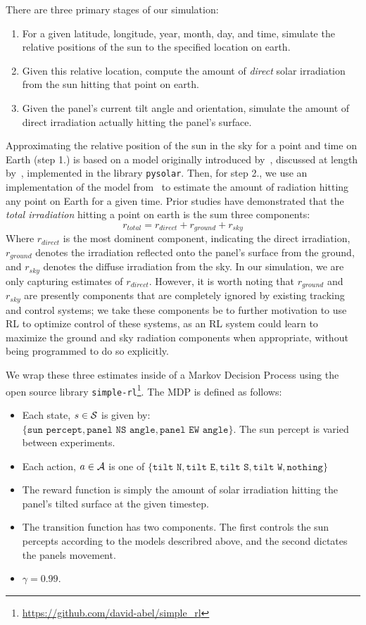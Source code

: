 \documentclass[11pt]{article}
\begin{document}
There are three primary stages of our simulation:
\begin{enumerate}
\item For a given latitude, longitude, year, month, day, and time, simulate the relative positions of the sun to the specified location on earth.
\item Given this relative location, compute the amount of {\it direct} solar irradiation from the sun hitting that point on earth.
\item Given the panel's current tilt angle and orientation, simulate the amount of direct irradiation actually hitting the panel's surface.
\end{enumerate}

Approximating the relative position of the sun in the sky for a point and time on Earth (step 1.) is based on a model originally introduced by~\citet{jordan1958chafer}, discussed at length by~\citet{masters2013renewable}, implemented in the library \texttt{pysolar}. Then, for step 2., we use an implementation of the model from~\citet{masters2013renewable} to estimate the amount of radiation hitting any point on Earth for a given time. Prior studies have demonstrated that the {\it total irradiation} hitting a point on earth is the sum three components:
\begin{equation}
r_{total} = r_{direct} + r_{ground} + r_{sky}
\end{equation}
Where $r_{direct}$ is the most dominent component, indicating the direct irradiation, $r_{ground}$ denotes the irradiation reflected onto the panel's surface from the ground, and $r_{sky}$ denotes the diffuse irradiation from the sky. In our simulation, we are only capturing estimates of $r_{direct}$. However, it is worth noting that $r_{ground}$ and $r_{sky}$ are presently components that are completely ignored by existing tracking and control systems; we take these components be to further motivation to use RL to optimize control of these systems, as an RL system could learn to maximize the ground and sky radiation components when appropriate, without being programmed to do so explicitly.

We wrap these three estimates inside of a Markov Decision Process using the open source library \texttt{simple-rl}\footnote{\url{https://github.com/david-abel/simple_rl}}. The MDP is defined as follows:
\begin{itemize}
\item Each state, $s \in \mathcal{S}$ is given by: $\{ \texttt{sun percept}, \texttt{panel NS angle}, \texttt{panel EW angle} \}$. The sun percept is varied between experiments.
\item Each action, $a \in \mathcal{A}$ is one of $\{\texttt{tilt N}, \texttt{tilt E}, \texttt{tilt S}, \texttt{tilt W}, \texttt{nothing}\}$
\item The reward function is simply the amount of solar irradiation hitting the panel's tilted surface at the given timestep.
\item The transition function has two components. The first controls the sun percepts according to the models describred above, and the second dictates the panels movement.
\item $\gamma = 0.99$.
\end{itemize}
\end{document}
